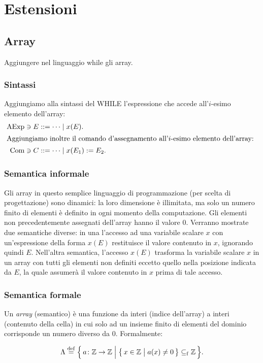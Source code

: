 \chapter{Estensioni}

\section{Array}

Aggiungere nel linguaggio while gli array.

\subsection{Sintassi}

Aggiungiamo alla sintassi del WHILE l'espressione che accede
all'$i$-esimo elemento dell'array:
\begin{align*}
  \AExp \ni E &::= \dots \vbar x(E). \\
\intertext{%
Aggiungiamo inoltre il comando d'assegnamento all'$i$-esimo elemento
dell'array:
}
  \Com \ni C &::= \dots \vbar x(E_1) := E_2.
\end{align*}

\subsection{Semantica informale}

Gli array in questo semplice linguaggio di programmazione (per scelta
di progettazione) sono dinamici: la loro dimensione è illimitata, ma
solo un numero finito di elementi è definito in ogni momento della
computazione.  Gli elementi non precedentemente assegnati dell'array
hanno il valore $0$.  Verranno mostrate due semantiche diverse: in una
l'accesso ad una variabile scalare $x$ con un'espressione della forma
$x(E)$ restituisce il valore contenuto in $x$, ignorando quindi $E$.
Nell'altra semantica, l'accesso $x(E)$ trasforma la variabile scalare
$x$ in un array con tutti gli elementi non definiti eccetto quello
nella posizione indicata da $E$, la quale assumerà il valore contenuto
in $x$ prima di tale accesso.

\subsection{Semantica formale}

\begin{definizione} 
Un \emph{array} (semantico) è una funzione da interi (indice
dell'array) a interi (contenuto della cella) in cui solo ad un insieme
finito di elementi del dominio corrisponde un numero diverso da $0$.
Formalmente:

\[
  \Lambda
    \defeq
      \Bigl\{\,
        \fund{a}{\Zset}{\Zset}
      \Bigm|
        \bigl\{\, x \in \Zset \bigm| a(x) \neq 0 \,\bigr\} \sseqf \Zset
      \,\Bigr\}.
\]
\end{definizione}

